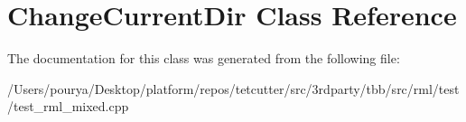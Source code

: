 \hypertarget{classChangeCurrentDir}{}\section{Change\+Current\+Dir Class Reference}
\label{classChangeCurrentDir}


The documentation for this class was generated from the following file\+:\begin{DoxyCompactItemize}
\item 
/\+Users/pourya/\+Desktop/platform/repos/tetcutter/src/3rdparty/tbb/src/rml/test/test\+\_\+rml\+\_\+mixed.\+cpp\end{DoxyCompactItemize}
